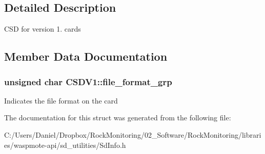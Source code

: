 \subsection{Detailed Description}
C\+SD for version 1. cards 

\subsection{Member Data Documentation}
\subsubsection[{\texorpdfstring{file\+\_\+format\+\_\+grp}{file_format_grp}}]{\setlength{\rightskip}{0pt plus 5cm}unsigned char C\+S\+D\+V1\+::file\+\_\+format\+\_\+grp}\hypertarget{struct_c_s_d_v1_aa104e58a9ff7e4a84f90f1015c210bec}{}\label{struct_c_s_d_v1_aa104e58a9ff7e4a84f90f1015c210bec}
Indicates the file format on the card 

The documentation for this struct was generated from the following file\+:\begin{DoxyCompactItemize}
\item 
C\+:/\+Users/\+Daniel/\+Dropbox/\+Rock\+Monitoring/02\+\_\+\+Software/\+Rock\+Monitoring/libraries/waspmote-\/api/sd\+\_\+utilities/Sd\+Info.\+h\end{DoxyCompactItemize}
